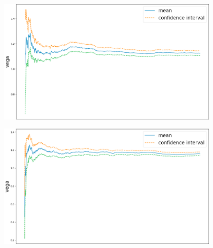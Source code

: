 \documentclass {article}
\begin{document}
			\newpage

			\begin{center}
				\begin{figure}[!h]
					\centering
				            \includegraphics[width=15cm, height=6cm]{stdBasketOptionFiniteDifferenceMethodVega.png}
				\end{figure}
			\end{center}
			
			
			\begin{center}
				\begin{figure}[!h]
					\centering
				            \includegraphics[width=15cm, height=6cm]{stdBasketOptionTangentModeVega.png}
				\end{figure}
			\end{center}
\end{document}
